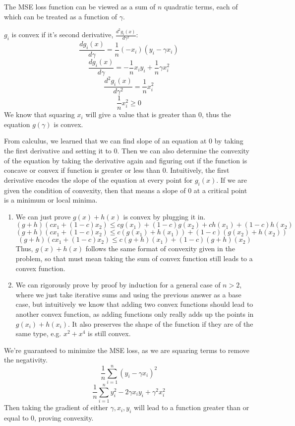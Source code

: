 \documentclass[11pt]{article}
\begin{document}
\newpage


\begin{Answer}
	\begin{Parts}
		\item The MSE loss function can be viewed as a sum of $n$ quadratic terms, each of which can be treated as a function of $\gamma$.
		\item $g_i$ is convex if it's second derivative, $\frac{d^2g_i(x)}{d\gamma^2}$:
		$$\frac{dg_i(x)}{d\gamma} = \frac{1}{n}(-x_i)(y_i - \gamma x_i)$$
		$$\frac{dg_i(x)}{d\gamma} = -\frac{1}{n}x_iy_i + \frac{1}{n}\gamma x_i^2$$
		$$\frac{d^2g_i(x)}{d\gamma^2} = \frac{1}{n}x_i^2$$
		$$\frac{1}{n}x_i^2 \geq 0$$
		We know that squaring $x_i$ will give a value that is greater than 0, thus the equation $g(\gamma)$ is convex.
		\item From calculus, we learned that we can find slope of an equation at 0 by taking the first derivative and setting it to 0. Then we can also determine the convexity of the equation by taking the derivative again and figuring out if the function is concave or convex if function is greater or less than 0. Intuitively, the first derivative encodes the slope of the equation at every point for $g_i(x)$. If we are given the condition of convexity, then that means a slope of 0 at a critical point is a minimum or local minima.
		\item 
		\begin{enumerate}[i]
			\item We can just prove $g(x) + h(x)$ is convex by plugging it in.
			$$(g + h)(cx_1 + (1 - c)x_2) \leq cg(x_1) + (1 - c)g(x_2) + ch(x_1) + (1 - c)h(x_2)$$
			$$(g + h)(cx_1 + (1 - c)x_2) \leq c(g(x_1) + h(x_1)) + (1 - c)(g(x_2) + h(x_2))$$
			$$(g + h)(cx_1 + (1 - c)x_2) \leq c(g + h)(x_1) + (1 - c)(g + h)(x_2)$$
			Thus, $g(x) + h(x)$ follows the same format of convexity given in the problem, so that must mean taking the sum of convex function still leads to a convex function.
			\item We can rigorously prove by proof by induction for a general case of $n > 2$, where we just take iterative sums and using the previous answer as a base case, but intuitively we know that adding two convex functions should lead to another convex function, as adding functions only really adds up the points in $g(x_i) + h(x_i)$. It also preserves the shape of the function if they are of the same type, e.g. $x^2 + x^4$ is still convex.
		\end{enumerate}
		\item We're guaranteed to minimize the MSE loss, as we are squaring terms to remove the negativity. 
		$$\frac{1}{n}\sum^n_{i = 1}(y_i - \gamma x_i)^2$$
		$$\frac{1}{n}\sum^n_{i = 1}y_i^2 - 2\gamma x_iy_i + \gamma^2x_i^2$$
		Then taking the gradient of either $\gamma, x_i, y_i$ will lead to a function greater than or equal to 0, proving convexity.
	\end{Parts}
\end{Answer}
\newpage
\end{document}
